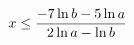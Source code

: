 \documentclass[preview]{standalone}
\begin{document}
\begin{align*}
\special{dvisvgm:raw <g id='unique000'>}x \le \frac{-7\ln b - 5\ln a}{2\ln a - \ln b}\special{dvisvgm:raw </g>}
\end{align*}
\end{document}
